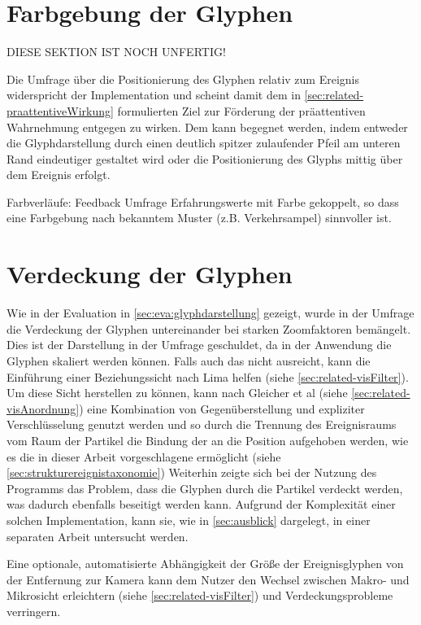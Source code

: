 \section{Farbgebung der Glyphen}
DIESE SEKTION IST NOCH UNFERTIG!

Die Umfrage über die Positionierung des Glyphen relativ zum Ereignis widerspricht der Implementation und scheint damit dem in \autoref{sec:related-praattentiveWirkung} formulierten Ziel zur Förderung der präattentiven Wahrnehmung entgegen zu wirken. Dem kann begegnet werden, indem entweder die Glyphdarstellung durch einen deutlich spitzer zulaufender Pfeil am unteren Rand eindeutiger gestaltet wird oder die Positionierung des Glyphs mittig über dem Ereignis erfolgt.

Farbverläufe: Feedback Umfrage
Erfahrungswerte mit Farbe gekoppelt, so dass eine Farbgebung nach bekanntem Muster (z.B. Verkehrsampel) sinnvoller ist.

\section{Verdeckung der Glyphen}
Wie in der Evaluation in \autoref{sec:eva:glyphdarstellung} gezeigt, wurde in der Umfrage die Verdeckung der Glyphen untereinander bei starken Zoomfaktoren bemängelt. Dies ist der Darstellung in der Umfrage geschuldet, da in der Anwendung die Glyphen skaliert werden können. Falls auch das nicht ausreicht, kann die Einführung einer Beziehungssicht nach Lima helfen (siehe \autoref{sec:related-visFilter}). Um diese Sicht herstellen zu können, kann nach Gleicher et al (siehe \autoref{sec:related-visAnordnung}) eine Kombination von Gegenüberstellung und expliziter Verschlüsselung genutzt werden und so durch die Trennung des Ereignisraums vom Raum der Partikel die Bindung der  an die Position aufgehoben werden, wie es die in dieser Arbeit vorgeschlagene  ermöglicht (siehe \autoref{sec:strukturereignistaxonomie})
Weiterhin zeigte sich bei der Nutzung des Programms das Problem, dass die Glyphen durch die Partikel verdeckt werden, was dadurch ebenfalls beseitigt werden kann.
Aufgrund der Komplexität einer solchen Implementation, kann sie, wie in \autoref{sec:ausblick} dargelegt, in einer separaten Arbeit untersucht werden. %

Eine optionale, automatisierte Abhängigkeit der Größe der Ereignisglyphen von der Entfernung zur Kamera kann dem Nutzer den Wechsel zwischen Makro- und Mikrosicht erleichtern (siehe \autoref{sec:related-visFilter}) und Verdeckungsprobleme verringern.
	
